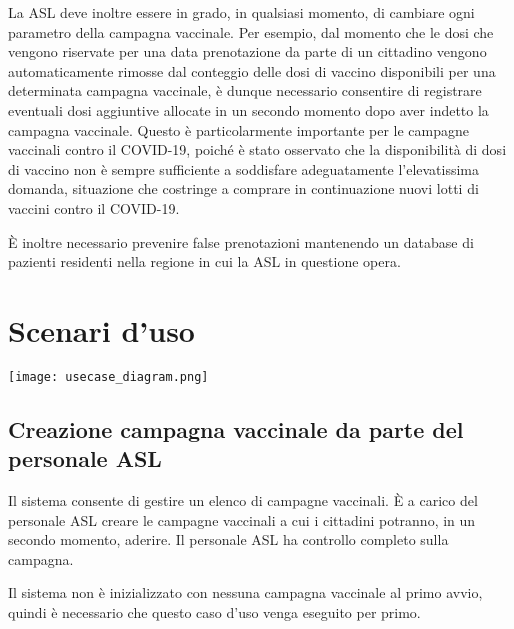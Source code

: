 \documentclass{article}
\begin{document}
La ASL deve inoltre essere in grado, in qualsiasi momento, di cambiare ogni parametro della campagna vaccinale. Per esempio, dal momento che le dosi che vengono riservate per una data prenotazione da parte di un cittadino vengono automaticamente rimosse dal conteggio delle dosi di vaccino disponibili per una determinata campagna vaccinale, è dunque necessario consentire di registrare eventuali dosi aggiuntive allocate in un secondo momento dopo aver indetto la campagna vaccinale. Questo è particolarmente importante per le campagne vaccinali contro il COVID-19, poiché è stato osservato che la disponibilità di dosi di vaccino non è sempre sufficiente a soddisfare adeguatamente l'elevatissima domanda, situazione che costringe a comprare in continuazione nuovi lotti di vaccini contro il COVID-19.

È inoltre necessario prevenire false prenotazioni mantenendo un database di pazienti residenti nella regione in cui la ASL in questione opera.

\newpage

\section{Scenari d'uso}

\begin{center}
    \texttt{[image: usecase\_diagram.png]}
\end{center}

\subsection{Creazione campagna vaccinale da parte del personale ASL}

Il sistema consente di gestire un elenco di campagne vaccinali. È a carico del personale ASL creare le campagne vaccinali a cui i cittadini potranno, in un secondo momento, aderire. Il personale ASL ha controllo completo sulla campagna.

Il sistema non è inizializzato con nessuna campagna vaccinale al primo avvio, quindi è necessario che questo caso d'uso venga eseguito per primo.

\newpage
\end{document}
